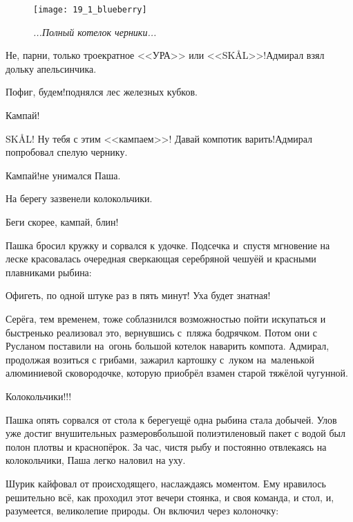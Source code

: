 \begin{wrapfigure}[11]{r}{0.45\textwidth}
	\centering
	\texttt{[image: 19\_1\_blueberry]}
	\caption{\small\textit{...Полный котелок черники...}}
\end{wrapfigure}


\diagdash Не, парни, только троекратное <<УРА>> или <<SKÅL>>!\mdash Адмирал взял дольку апельсинчика.


\diagdash Пофиг, будем!\mdash поднялся лес железных кубков.

\diagdash Кампай!

\diagdash SKÅL! Ну тебя с этим <<кампаем>>! Давай компотик варить!\mdash Адмирал попробовал спелую чернику.

\diagdash Кампай!\mdash не унимался Паша.

На берегу зазвенели колокольчики.

\diagdash Беги скорее, кампай, блин!

Пашка бросил кружку и сорвался к удочке. Подсечка и~спустя мгновение на леске красовалась очередная сверкающая серебряной чешуёй и красными плавниками рыбина:

\diagdash Офигеть, по одной штуке раз в пять минут! Уха будет знатная!

Серёга, тем временем, тоже соблазнился возможностью пойти искупаться и быстренько реализовал это, вернувшись с~пляжа бодрячком. Потом они с Русланом поставили на~огонь большой котелок наварить компота. Адмирал, продолжая возиться с грибами, зажарил картошку с~луком на~маленькой алюминиевой сковородочке, которую приобрёл взамен старой тяжёлой чугунной. 

\diagdash Колокольчики!!!

Пашка опять сорвался от стола к берегу\mdash ещё одна рыбина стала добычей. Улов уже достиг внушительных размеров\mdash большой полиэтиленовый пакет с водой был полон плотвы и краснопёрок. За час, чистя рыбу и постоянно отвлекаясь на колокольчики, Паша легко наловил на уху.

Шурик кайфовал от происходящего, наслаждаясь моментом. Ему нравилось решительно всё, как проходил этот вечер\mdash и стоянка, и своя команда, и стол, и, разумеется, великолепие природы. Он включил через колоночку:

